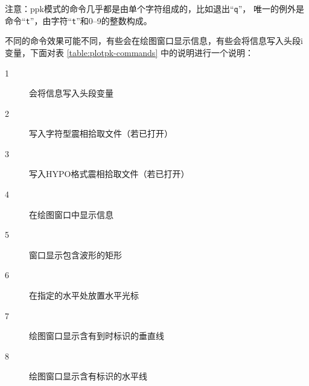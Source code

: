 注意：ppk模式的命令几乎都是由单个字符组成的，比如退出``\texttt{q}''，
唯一的例外是命令``\texttt{t}''，由字符``\texttt{t}''和0--9的整数构成。

不同的命令效果可能不同，有些会在绘图窗口显示信息，有些会将信息写入头段i
变量，下面对表 \ref{table:plotpk-commands} 中的说明进行一个说明：
\begin{description}
    \item [1] 会将信息写入头段变量
    \item [2] 写入字符型震相拾取文件（若已打开）
    \item [3] 写入HYPO格式震相拾取文件（若已打开）
    \item [4] 在绘图窗口中显示信息
    \item [5] 窗口显示包含波形的矩形
    \item [6] 在指定的水平处放置水平光标
    \item [7] 绘图窗口显示含有到时标识的垂直线
    \item [8] 绘图窗口显示含有标识的水平线
\end{description}
